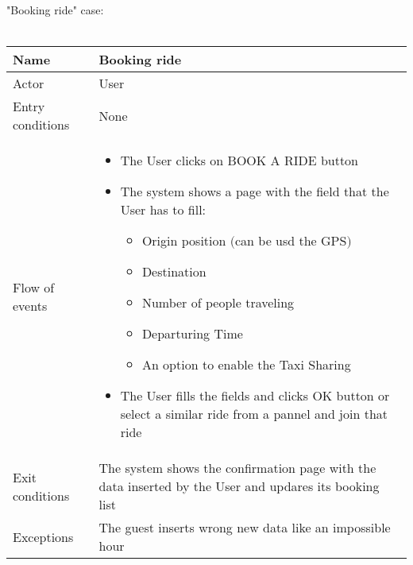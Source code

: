 \newpage
"Booking ride" case:
\\
\\
\begin{tabular}{|p{3cm}|p{10cm}|}
\hline
Name & Booking ride\\
\hline
Actor & User\\
\hline
Entry conditions & None\\
\hline
Flow of events &
	\begin{itemize}
		\item The User clicks on BOOK A RIDE button
		\item The system shows a page with the field that the User has to fill:
		\begin{itemize}
			\item Origin position $($can be usd the GPS$)$
			\item Destination
			\item Number of people traveling
			\item Departuring Time
			\item An option to enable the Taxi Sharing
		\end{itemize}
		\item The User fills the fields and clicks OK button or select a similar ride from a pannel and join that ride
	\end{itemize}\\
\hline
Exit conditions & The system shows the confirmation page with the data inserted by the User and updares its booking list\\
\hline
Exceptions & The guest inserts wrong new data like an impossible hour\\
\hline
\end {tabular}


